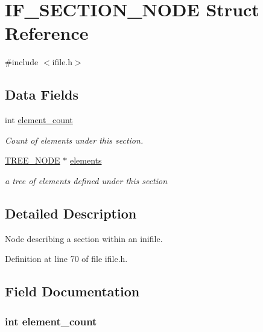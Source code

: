 \hypertarget{struct_i_f___s_e_c_t_i_o_n___n_o_d_e}{\section{I\-F\-\_\-\-S\-E\-C\-T\-I\-O\-N\-\_\-\-N\-O\-D\-E Struct Reference}
\label{struct_i_f___s_e_c_t_i_o_n___n_o_d_e}
}


{\ttfamily \#include $<$ifile.\-h$>$}

\subsection*{Data Fields}
\begin{DoxyCompactItemize}
\item 
int \hyperlink{struct_i_f___s_e_c_t_i_o_n___n_o_d_e_aefcb7028280d7a692203f3b46b1c42be}{element\-\_\-count}
\begin{DoxyCompactList}\small\item\em Count of elements under this section. \end{DoxyCompactList}\item 
\hyperlink{btacc_8h_a401cf184fc63368a8957143cbb772739}{T\-R\-E\-E\-\_\-\-N\-O\-D\-E} $\ast$ \hyperlink{struct_i_f___s_e_c_t_i_o_n___n_o_d_e_acc1e310201bdd586432fffda63f2f863}{elements}
\begin{DoxyCompactList}\small\item\em a tree of elements defined under this section \end{DoxyCompactList}\end{DoxyCompactItemize}


\subsection{Detailed Description}
Node describing a section within an inifile. 

Definition at line 70 of file ifile.\-h.



\subsection{Field Documentation}
\hypertarget{struct_i_f___s_e_c_t_i_o_n___n_o_d_e_aefcb7028280d7a692203f3b46b1c42be}{
\subsubsection[{element\-\_\-count}]{\setlength{\rightskip}{0pt plus 5cm}int element\-\_\-count}}\label{struct_i_f___s_e_c_t_i_o_n___n_o_d_e_aefcb7028280d7a692203f3b46b1c42be}


